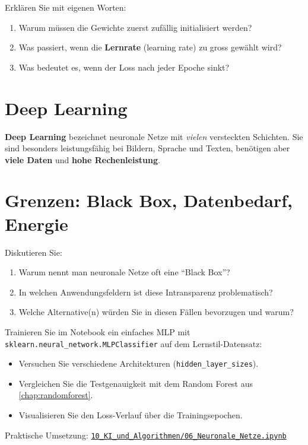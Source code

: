 \begin{myexercise}
Erklären Sie mit eigenen Worten:
\begin{enumerate}
    \item Warum müssen die Gewichte zuerst zufällig initialisiert werden?
    \item Was passiert, wenn die \textbf{Lernrate} (learning rate) zu gross gewählt wird?
    \item Was bedeutet es, wenn der Loss nach jeder Epoche sinkt?
\end{enumerate}
\end{myexercise}

\section{Deep Learning}

\begin{myremark}
\textbf{Deep Learning} bezeichnet neuronale Netze mit \emph{vielen} versteckten Schichten.
Sie sind besonders leistungsfähig bei Bildern, Sprache und Texten,
benötigen aber \textbf{viele Daten} und \textbf{hohe Rechenleistung}.
\end{myremark}

\section{Grenzen: Black Box, Datenbedarf, Energie}

\begin{myexercise}
Diskutieren Sie:
\begin{enumerate}
    \item Warum nennt man neuronale Netze oft eine \enquote{Black Box}?
    \item In welchen Anwendungsfeldern ist diese Intransparenz problematisch?
    \item Welche Alternative(n) würden Sie in diesen Fällen bevorzugen und warum?
\end{enumerate}
\end{myexercise}

\begin{mychallenge}
Trainieren Sie im Notebook ein einfaches MLP mit \texttt{sklearn.neural\_network.MLPClassifier}
auf dem Lernstil-Datensatz:
\begin{itemize}
    \item Versuchen Sie verschiedene Architekturen (\texttt{hidden\_layer\_sizes}).
    \item Vergleichen Sie die Testgenauigkeit mit dem Random Forest aus  \cref{chap:randomforest}.
    \item Visualisieren Sie den Loss-Verlauf über die Trainingsepochen.
\end{itemize}
\end{mychallenge}

\begin{myremark}[Notebook]
Praktische Umsetzung:
\href{\notebookurl}{\texttt{10\_KI\_und\_Algorithmen/06\_Neuronale\_Netze.ipynb}}
\end{myremark}
